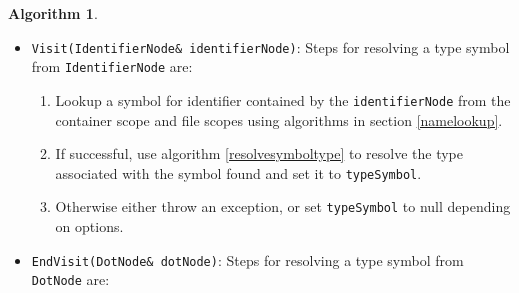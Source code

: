 \documentclass[a4paper,oneside,11pt]{book}
\theoremstyle{definition}
\newtheorem{algo}{Algorithm}[section]
\begin{document}
\begin{algo}
\begin{itemize}
\verb|Visit(TemplateIdNode& templateIdNode)|:
The \verb|TemplateIdNode| contains:
\begin{itemize}
\item
an abstract syntax tree node that represents the primary class type of a class template specialization (definition \ref{primaryclasstype}).
\item
a list of abstract syntax tree nodes that represent the type arguments of a class template specialization.
\end{itemize}
Steps for resolving a type symbol from \verb|TemplateIdNode| are:
\begin{enumerate}
\item
Resolve the primary class type symbol by calling this algorithm recursively. Let $p$ be the resolved primary class type symbol.
Let $n$ be the number of type parameters of the primary class type symbol.
\item
Resolve the type arguments by calling this algorithm recursively. Let $a$ be the list of type arguments resolved. Let $m$ be the length of list $a$.
\item
If $m < n$ use algorithm \ref{resolvedefaulttypearguments} of class template repository to resolve default type arguments and append them to list $a$.
\item
Make a class template specialization symbol using algorithm \ref{maketemplatetype} of type repository with arguments $p$ and $a$.
\item
Set \verb|typeSymbol| to returned class template specialization type symbol.
\end{enumerate}
\item
\verb|Visit(IdentifierNode& identifierNode)|:
Steps for resolving a type symbol from \verb|IdentifierNode| are:
\begin{enumerate}
\item
Lookup a symbol for identifier contained by the \verb|identifierNode| from the container scope and file scopes using algorithms in section \ref{namelookup}.
\item
If successful, use algorithm \ref{resolvesymboltype} to resolve the type associated with the symbol found and set it to \verb|typeSymbol|.
\item
Otherwise either throw an exception, or set \verb|typeSymbol| to null depending on options.
\end{enumerate}
\item
\verb|EndVisit(DotNode& dotNode)|:
Steps for resolving a type symbol from \verb|DotNode| are:
\begin{enumerate}

\end{enumerate}
\end{itemize}
\end{algo}
\end{document}
